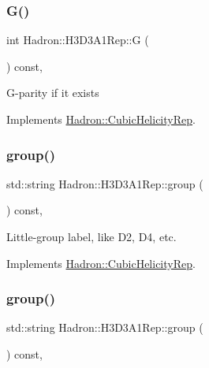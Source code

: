 \subsubsection{\texorpdfstring{G()}{G()}\hspace{0.1cm}{\footnotesize\ttfamily [3/3]}}
{\footnotesize\ttfamily int Hadron\+::\+H3\+D3\+A1\+Rep\+::G (\begin{DoxyParamCaption}{ }\end{DoxyParamCaption}) const\hspace{0.3cm}{\ttfamily [inline]}, {\ttfamily [virtual]}}

G-\/parity if it exists 

Implements \mbox{\hyperlink{structHadron_1_1CubicHelicityRep_a50689f42be1e6170aa8cf6ad0597018b}{Hadron\+::\+Cubic\+Helicity\+Rep}}.

\mbox{\label{structHadron_1_1H3D3A1Rep_a4b4fc6752f25df5714c95532184a4f8e}} 
\subsubsection{\texorpdfstring{group()}{group()}\hspace{0.1cm}{\footnotesize\ttfamily [1/5]}}
{\footnotesize\ttfamily std\+::string Hadron\+::\+H3\+D3\+A1\+Rep\+::group (\begin{DoxyParamCaption}{ }\end{DoxyParamCaption}) const\hspace{0.3cm}{\ttfamily [inline]}, {\ttfamily [virtual]}}

Little-\/group label, like D2, D4, etc. 

Implements \mbox{\hyperlink{structHadron_1_1CubicHelicityRep_a101a7d76cd8ccdad0f272db44b766113}{Hadron\+::\+Cubic\+Helicity\+Rep}}.

\mbox{\label{structHadron_1_1H3D3A1Rep_a4b4fc6752f25df5714c95532184a4f8e}} 
\subsubsection{\texorpdfstring{group()}{group()}\hspace{0.1cm}{\footnotesize\ttfamily [2/5]}}
{\footnotesize\ttfamily std\+::string Hadron\+::\+H3\+D3\+A1\+Rep\+::group (\begin{DoxyParamCaption}{ }\end{DoxyParamCaption}) const\hspace{0.3cm}{\ttfamily [inline]}, {\ttfamily [virtual]}}

